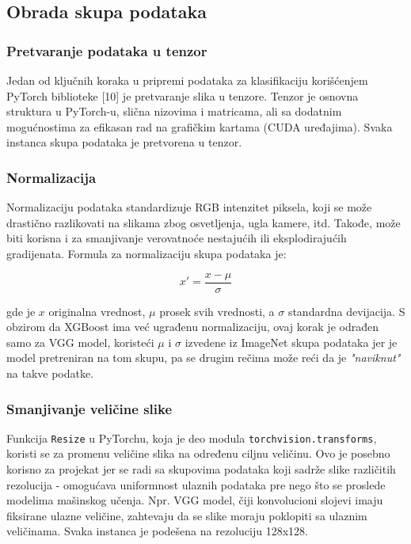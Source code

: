 \documentclass{article}
\begin{document}
\subsection{Obrada skupa podataka}

\subsubsection{Pretvaranje podataka u tenzor}

Jedan od ključnih koraka u pripremi podataka za klasifikaciju korišćenjem PyTorch biblioteke [10] je pretvaranje slika u tenzore. Tenzor je osnovna struktura u PyTorch-u, slična nizovima i matricama, ali sa dodatnim mogućnostima za efikasan rad na grafičkim kartama (CUDA uređajima). Svaka instanca skupa podataka je pretvorena u tenzor.

\subsubsection{Normalizacija}
\par
Normalizaciju podataka standardizuje RGB intenzitet piksela, koji se može drastično razlikovati na slikama zbog osvetljenja, ugla kamere, itd. Takođe, može biti korisna i za smanjivanje verovatnoće nestajućih ili eksplodirajućih gradijenata. Formula za normalizaciju skupa podataka je:

\[
x' = \frac{x - \mu}{\sigma}
\]

gde je \( x \) originalna vrednost, \( \mu \) prosek svih vrednosti, a \( \sigma \) standardna devijacija. S obzirom da XGBoost ima već ugrađenu normalizaciju, ovaj korak je odrađen samo za VGG model, koristeći \( \mu \) i \( \sigma \) izvedene iz ImageNet skupa podataka jer je model pretreniran na tom skupu, pa se drugim rečima može reći da je \textit{"naviknut"} na takve podatke.

\subsubsection{Smanjivanje veličine slike}
Funkcija \texttt{Resize} u PyTorchu, koja je deo modula \texttt{torchvision.transforms}, koristi se za promenu veličine slika na određenu ciljnu veličinu. Ovo je posebno korisno za projekat jer se radi sa skupovima podataka koji sadrže slike različitih rezolucija - omogućava uniformnost ulaznih podataka pre nego što se proslede modelima mašinskog učenja. Npr. VGG model, čiji konvolucioni slojevi imaju fiksirane ulazne veličine, zahtevaju da se slike moraju poklopiti sa ulaznim veličinama. Svaka instanca je podešena na rezoluciju 128x128.
\end{document}
